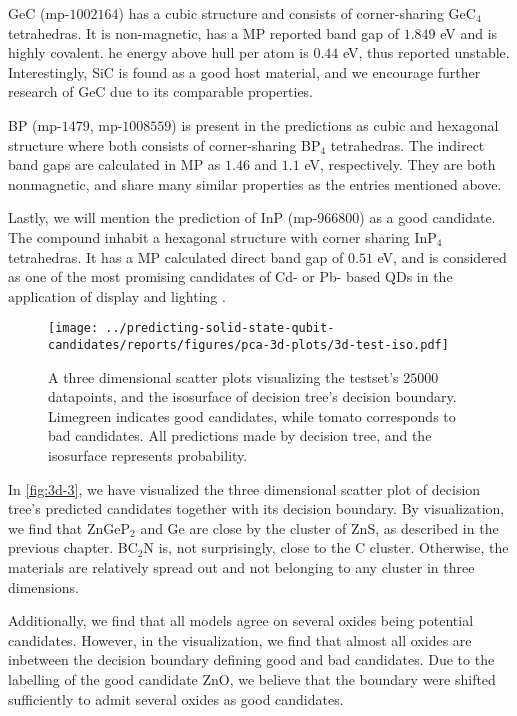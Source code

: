 GeC (mp-$1002164$) \cite{GeC} has a cubic structure and consists of corner-sharing GeC$_4$ tetrahedras. It is non-magnetic, has a MP reported band gap of $1.849$ eV and is highly covalent. he energy above hull per atom is $0.44$ eV, thus reported unstable. Interestingly, SiC is found as a good host material, and we encourage further research of GeC due to its comparable properties.

BP (mp-$1479$, mp-$1008559$) is present in the predictions as cubic \cite{BP1} and hexagonal \cite{BP2} structure where both consists of corner-sharing BP$_4$ tetrahedras. The indirect band gaps are calculated in MP as $1.46$ and $1.1$ eV, respectively. They are both nonmagnetic, and share many similar properties as the entries mentioned above.

Lastly, we will mention the prediction of InP (mp-$966800$) \cite{InP} as a good candidate. The compound inhabit a hexagonal structure with corner sharing InP$_4$ tetrahedras. It has a MP calculated direct band gap of $0.51$ eV, and is considered as one of the most promising candidates of Cd- or Pb- based QDs in the application of display and lighting \cite{Zhang2020a, Won2019}.

\begin{figure}[ht!]
    \centering
    \texttt{[image: ../predicting-solid-state-qubit-candidates/reports/figures/pca-3d-plots/3d-test-iso.pdf]}
    \vspace*{-130mm}
    \caption{A three dimensional scatter plots visualizing the testset's $25000$ datapoints, and the isosurface of decision tree's decision boundary. Limegreen indicates good candidates, while tomato corresponds to bad candidates. All predictions made by decision tree, and the isosurface represents probability.}
    \label{fig:3d-3}
\end{figure}

In \autoref{fig:3d-3}, we have visualized the three dimensional scatter plot of decision tree's predicted candidates together with its decision boundary. By visualization, we find that ZnGeP$_2$ and Ge are close by the cluster of ZnS, as described in the previous chapter. BC$_2$N is, not surprisingly, close to the C cluster. Otherwise, the materials are relatively spread out and not belonging to any cluster in three dimensions.

Additionally, we find that all models agree on several oxides being potential candidates. However, in the visualization, we find that almost all oxides are inbetween the decision boundary defining good and bad candidates. Due to the labelling of the good candidate ZnO, we believe that the boundary were shifted sufficiently to admit several oxides as good candidates.



